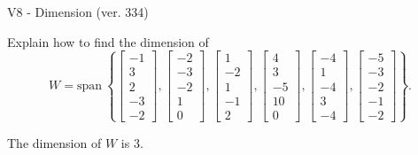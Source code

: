 \begin{exercise}
  \begin{exerciseTitle}V8 - Dimension (ver. 334)\end{exerciseTitle}
  \begin{exerciseStatement}
    Explain how to find the dimension of 
\[W=\mathrm{span}\ \left\{\left[\begin{array}{r}
-1 \\
3 \\
2 \\
-3 \\
-2
\end{array}\right] , \left[\begin{array}{r}
-2 \\
-3 \\
-2 \\
1 \\
0
\end{array}\right] , \left[\begin{array}{r}
1 \\
-2 \\
1 \\
-1 \\
2
\end{array}\right] , \left[\begin{array}{r}
4 \\
3 \\
-5 \\
10 \\
0
\end{array}\right] , \left[\begin{array}{r}
-4 \\
1 \\
-4 \\
3 \\
-4
\end{array}\right] , \left[\begin{array}{r}
-5 \\
-3 \\
-2 \\
-1 \\
-2
\end{array}\right]\right\}.\]



  \end{exerciseStatement}
  \begin{exerciseAnswer}
   The dimension of \(W\) is  \(3\).
  


  \end{exerciseAnswer}
\end{exercise}